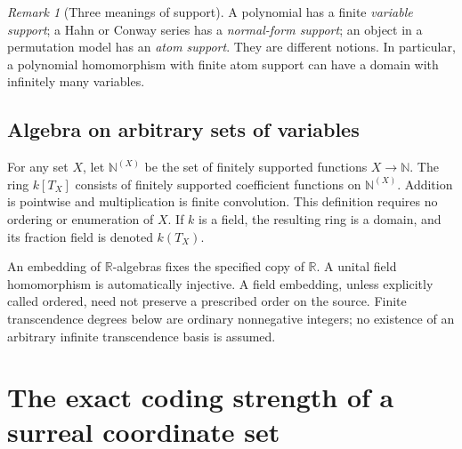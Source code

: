 \documentclass[11pt,letterpaper]{article}
\theoremstyle{definition}
\theoremstyle{remark}
\newtheorem{remark}[remark]{Remark}\aliascntresetthe{remark}
\newcommand{\R}{\mathbb R}
\newcommand{\N}{\mathbb N}
\begin{document}
\begin{remark}[Three meanings of support]
A polynomial has a finite \emph{variable support}; a Hahn or Conway series has a \emph{normal-form support}; an object in a permutation model has an \emph{atom support}. They are different notions. In particular, a polynomial homomorphism with finite atom support can have a domain with infinitely many variables.
\end{remark}

\subsection{Algebra on arbitrary sets of variables}
For any set $X$, let $\N^{(X)}$ be the set of finitely supported functions $X\to\N$. The ring $k[T_X]$ consists of finitely supported coefficient functions on $\N^{(X)}$. Addition is pointwise and multiplication is finite convolution. This definition requires no ordering or enumeration of $X$. If $k$ is a field, the resulting ring is a domain, and its fraction field is denoted $k(T_X)$.

An embedding of $\R$-algebras fixes the specified copy of $\R$. A unital field homomorphism is automatically injective. A field embedding, unless explicitly called ordered, need not preserve a prescribed order on the source. Finite transcendence degrees below are ordinary nonnegative integers; no existence of an arbitrary infinite transcendence basis is assumed.

\section{The exact coding strength of a surreal coordinate set}
\label{hset:kw:sec:coding}
\end{document}
